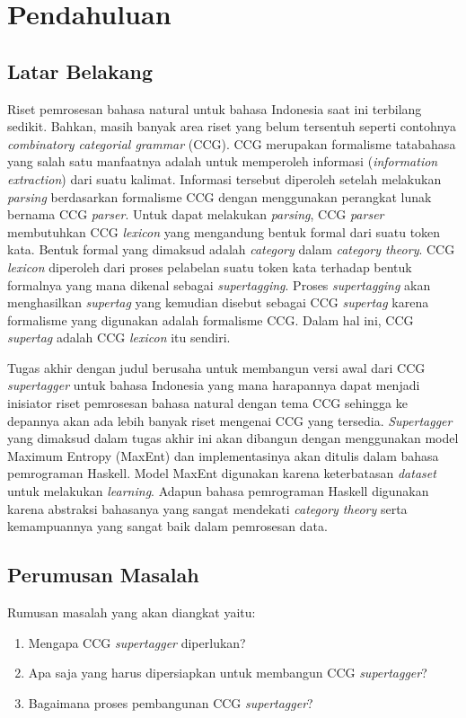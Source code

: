 \chapter{Pendahuluan}
\section{Latar Belakang}

Riset pemrosesan bahasa natural untuk bahasa Indonesia saat ini terbilang sedikit.
Bahkan, masih banyak area riset yang belum tersentuh seperti contohnya
\textit{combinatory categorial grammar} (CCG).
CCG merupakan formalisme tatabahasa yang salah satu manfaatnya adalah untuk memperoleh informasi
(\textit{information extraction}) dari suatu kalimat.
Informasi tersebut diperoleh setelah melakukan \textit{parsing} berdasarkan formalisme CCG dengan
menggunakan perangkat lunak bernama CCG \textit{parser}.
Untuk dapat melakukan \textit{parsing}, CCG \textit{parser} membutuhkan CCG \textit{lexicon}
yang mengandung bentuk formal dari suatu token kata.
Bentuk formal yang dimaksud adalah \textit{category} dalam \textit{category theory}.
CCG \textit{lexicon} diperoleh dari proses pelabelan suatu token kata terhadap bentuk formalnya yang
mana dikenal sebagai \textit{supertagging}.
Proses \textit{supertagging} akan menghasilkan \textit{supertag} yang kemudian disebut sebagai CCG
\textit{supertag} karena formalisme yang digunakan adalah formalisme CCG.
Dalam hal ini, CCG \textit{supertag} adalah CCG \textit{lexicon} itu sendiri.

Tugas akhir dengan judul \say{\Title} berusaha untuk membangun versi awal dari CCG
\textit{supertagger} untuk bahasa Indonesia yang mana harapannya dapat menjadi inisiator riset
pemrosesan bahasa natural dengan tema CCG sehingga ke depannya akan ada lebih banyak riset
mengenai CCG yang tersedia.
\textit{Supertagger} yang dimaksud dalam tugas akhir ini akan dibangun dengan menggunakan model
Maximum Entropy (MaxEnt) dan implementasinya akan ditulis dalam bahasa pemrograman Haskell.
Model MaxEnt digunakan karena keterbatasan \textit{dataset} untuk melakukan \textit{learning}.
Adapun bahasa pemrograman Haskell digunakan karena abstraksi bahasanya yang sangat mendekati
\textit{category theory} serta kemampuannya yang sangat baik dalam pemrosesan data.

\section{Perumusan Masalah}
Rumusan masalah yang akan diangkat yaitu:
\begin{enumerate}
    \item Mengapa CCG \textit{supertagger} diperlukan?
    \item Apa saja yang harus dipersiapkan untuk membangun CCG \textit{supertagger}?
    \item Bagaimana proses pembangunan CCG \textit{supertagger}?
\end{enumerate}
